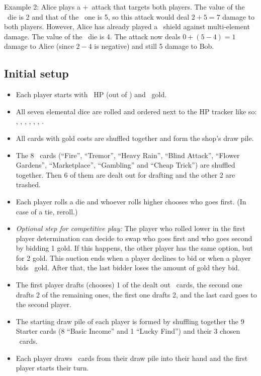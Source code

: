\documentclass[dvipsnames,parskip,a4paper]{scrartcl}
\begin{document}
\vspace{4pt}

Example 2: Alice plays a \water\hspace{1pt}$+$\hspace{1pt}\earth \ attack that targets both players. The value of the \water \ die is 2 and that of the \earth \ one is 5, so this attack would deal $2 + 5 = 7$ damage to both players. However, Alice has already played a \magic \ shield against multi-element damage. The value of the \magic \ die is 4. The attack now deals $0 + (5 - 4) = 1$ damage to Alice (since $2 - 4$ is negative) and still 5 damage to Bob.

\newpage

\subsection*{Initial setup}

\begin{itemize}
\item Each player starts with \starthp \ HP (out of \maxhp) and \startgold \ gold.
\item All seven elemental dice are rolled and ordered next to the HP tracker like so: \chance, \fire, \earth, \water, \nature, \gold, \magic.
\item All cards with gold costs are shuffled together and form the shop's draw pile.
\item The 8 \draft \ cards (``Fire'', ``Tremor'', ``Heavy Rain'', ``Blind Attack'', ``Flower Gardens'', ``Marketplace'', ``Gambling'' and ``Cheap Trick'') are shuffled together. Then 6 of them are dealt out for drafting and the other 2 are trashed.
\item Each player rolls a die and whoever rolls higher chooses who goes first. (In case of a tie, reroll.)
\item \textit{Optional step for competitive play:} The player who rolled lower in the first player determination can decide to swap who goes first and who goes second by bidding 1 gold. If this happens, the other player has the same option, but for 2 gold. This auction ends when a player declines to bid or when a player bids \startgold \ gold. After that, the last bidder loses the amount of gold they bid.
\item The first player drafts (chooses) 1 of the dealt out \draft \ cards, the second one drafts 2 of the remaining ones, the first one drafts 2, and the last card goes to the second player.
\item The starting draw pile of each player is formed by shuffling together the 9 Starter cards (8 ``Basic Income'' and 1 ``Lucky Find'') and their 3 chosen \draft \ cards.
\item Each player draws \handsize \ cards from their draw pile into their hand and the first player starts their turn.
\end{itemize}
\end{document}
